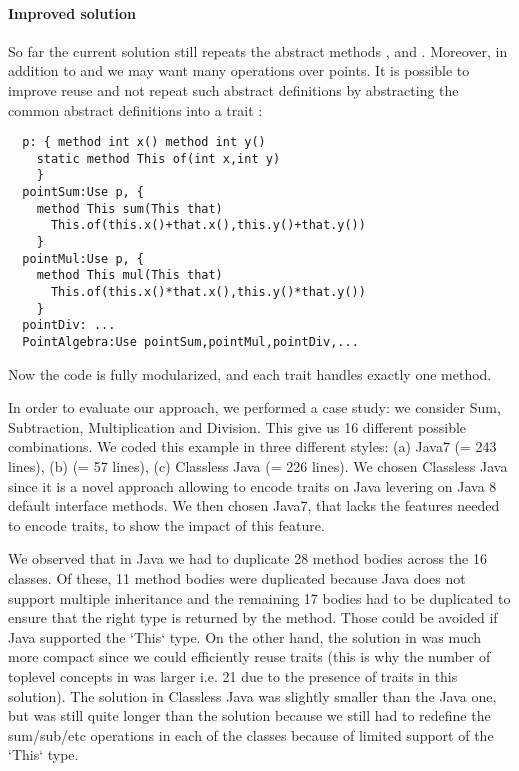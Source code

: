   \paragraph{Improved solution} So far the current solution still
  repeats the abstract methods \Q@x@, \Q@y@ and \Q@of@.
  Moreover, in addition to \Q@sum@ and \Q@mul@ we may want many
  operations over points. It is possible to improve reuse
  and not repeat such abstract definitions by abstracting the common
  abstract definitions into a trait \Q@p@: 
\saveSpace
\begin{lstlisting}
  p: { method int x() method int y()
    static method This of(int x,int y)
    }
  pointSum:Use p, { 
    method This sum(This that)
      This.of(this.x()+that.x(),this.y()+that.y())
    }
  pointMul:Use p, { 
    method This mul(This that)
      This.of(this.x()*that.x(),this.y()*that.y())
    }
  pointDiv: ...
  PointAlgebra:Use pointSum,pointMul,pointDiv,...
\end{lstlisting}
\saveSpace      
Now the code is fully modularized, and each trait handles exactly one method.

In order to evaluate our approach,
we performed a case study:
we consider Sum, Subtraction, Multiplication and Division.
This give us 16 different possible combinations.
We coded this example in three different styles:
(a) Java7 (= 243 lines), (b) \name (= 57 lines), (c) Classless Java (= 226 lines).
We chosen Classless Java since it is a novel approach allowing to encode traits on Java levering on 
Java 8 default interface methods.
We then chosen Java7, that lacks the features needed to encode traits, to show the impact of this feature.

We observed that in Java we had to duplicate 28 method bodies across the 16 classes.
Of these, 11 method bodies were duplicated because Java does not support multiple inheritance
 and the remaining 17 bodies had to be duplicated to ensure that the right type
 is returned by the method. Those could be avoided if Java supported
 the `This` type.
 On the other hand, the solution in \name was much more compact since we could efficiently
reuse traits (this is why the number of toplevel concepts in \name was larger i.e. 21 due to the
 presence of traits in this solution).
 The solution in Classless Java was slightly smaller than the Java one,
 but was still quite longer than the \name solution because we still had to redefine the
 sum/sub/etc operations in each of the classes because of limited support of the `This` type.

